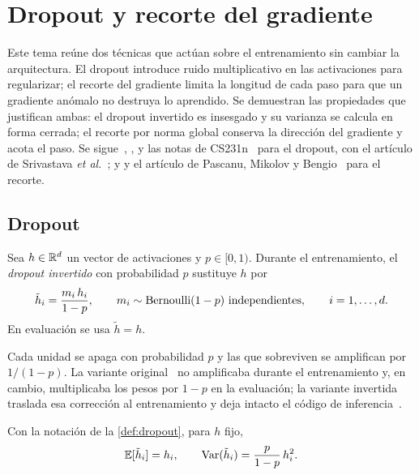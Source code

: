 \chapter{Dropout y recorte del gradiente}
\label{tema:4}

Este tema reúne dos técnicas que actúan sobre el entrenamiento sin cambiar la arquitectura. El dropout introduce ruido multiplicativo en las activaciones para regularizar; el recorte del gradiente limita la longitud de cada paso para que un gradiente anómalo no destruya lo aprendido. Se demuestran las propiedades que justifican ambas: el dropout invertido es insesgado y su varianza se calcula en forma cerrada; el recorte por norma global conserva la dirección del gradiente y acota el paso. Se sigue~\cite[§7.12]{gbc}, \cite[§5.6]{d2l}, \cite[§9.6.1]{bishopdl} y las notas de CS231n~\cite{cs231n} para el dropout, con el artículo de Srivastava \emph{et al.}~\cite{srivastava}; y \cite[§8.2.4 y §10.11]{gbc} y el artículo de Pascanu, Mikolov y Bengio~\cite{pascanu} para el recorte.

\section{Dropout}

\begin{definicion}\label{def:dropout}
Sea $h\in\mathbb{R}^{d}$ un vector de activaciones y $p\in[0,1)$. Durante el entrenamiento, el \emph{dropout invertido} con probabilidad $p$ sustituye $h$ por
\[
\tilde h_i=\frac{m_i\,h_i}{1-p},\qquad m_i\sim\operatorname{Bernoulli}(1-p)\ \text{independientes},\qquad i=1,\dots,d.
\]
En evaluación se usa $\tilde h=h$.
\end{definicion}

Cada unidad se apaga con probabilidad $p$ y las que sobreviven se amplifican por $1/(1-p)$. La variante original~\cite{srivastava} no amplificaba durante el entrenamiento y, en cambio, multiplicaba los pesos por $1-p$ en la evaluación; la variante invertida traslada esa corrección al entrenamiento y deja intacto el código de inferencia~\cite{cs231n}.

\begin{proposicion}\label{prop:dropout}
Con la notación de la \cref{def:dropout}, para $h$ fijo,
\[
\mathbb{E}[\tilde h_i]=h_i,\qquad \operatorname{Var}(\tilde h_i)=\frac{p}{1-p}\,h_i^{2}.
\]
\end{proposicion}

